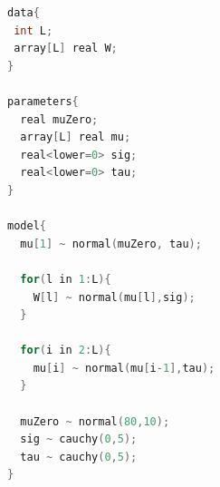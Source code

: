 \begin{lstlisting}[language=C++,label={stan::29_01},caption={ホワイトノイズモデル}]
data{
 int L;
 array[L] real W;
}

parameters{
  real muZero;
  array[L] real mu;
  real<lower=0> sig;
  real<lower=0> tau;
}

model{
  mu[1] ~ normal(muZero, tau);
  
  for(l in 1:L){
    W[l] ~ normal(mu[l],sig);
  }
  
  for(i in 2:L){
    mu[i] ~ normal(mu[i-1],tau);
  }
  
  muZero ~ normal(80,10); 
  sig ~ cauchy(0,5);
  tau ~ cauchy(0,5);
}
\end{lstlisting}
